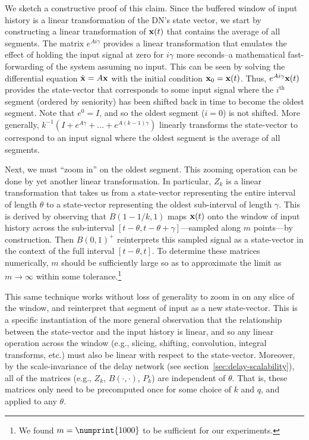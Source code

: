 We sketch a constructive proof of this claim.
Since the buffered window of input history is a linear transformation of the DN's state vector, we start by constructing a linear transformation of $\mathbf{x}(t)$ that contains the average of all segments. 
The matrix $e^{A i \gamma}$ provides a linear transformation that emulates the effect of holding the input signal at zero for $i \gamma$ more seconds--a mathematical fast-forwarding of the system assuming no input.
This can be seen by solving the differential equation $\dot{\mathbf{x}} = A \mathbf{x}$ with the initial condition $\mathbf{x}_0 = \mathbf{x}(t)$.
Thus, $e^{A i \gamma} \mathbf{x}(t)$ provides the state-vector that corresponds to some input signal where the $i^\text{th}$ segment (ordered by seniority) has been shifted back in time to become the oldest segment. 
Note that $e^0 = I$, and so the oldest segment ($i=0$) is not shifted.
More generally, $k^{-1} \left( I + e^{A \gamma} + \ldots + e^{A (k-1) \gamma} \right)$ linearly transforms the state-vector to correspond to an input signal where the oldest segment is the average of all segments.

Next, we must ``zoom in'' on the oldest segment.  
This zooming operation can be done by yet another linear transformation.
In particular, $Z_k$ is a linear transformation that takes us from a state-vector representing the entire interval of length $\theta$ to a state-vector representing the oldest sub-interval of length $\gamma$.
This is derived by observing that $B(1 - 1/k, 1)$ maps $\mathbf{x}(t)$ onto the window of input history across the sub-interval $[t - \theta, t - \theta + \gamma]$---sampled along $m$ points---by construction.
Then $B(0, 1)^+$ reinterprets this sampled signal as a state-vector in the context of the full interval $[t - \theta, t]$.
To determine these matrices numerically, $m$ should be sufficiently large so as to approximate the limit as $m \rightarrow \infty$ within some tolerance.\footnote{
We found $m = \numprint{1000}$ to be sufficient for our experiments.}

This same technique works without loss of generality to zoom in on any slice of the window, and reinterpret that segment of input as a new state-vector. This is a specific instantiation of the more general observation that the relationship between the state-vector and the input history is linear, and so any linear operation across the window (e.g., slicing, shifting, convolution, integral transforms, etc.) must also be linear with respect to the state-vector.
Moreover, by the scale-invariance of the delay network (see section~\ref{sec:delay-scalability}), all of the matrices (e.g., $Z_k$, $B(\cdot, \cdot)$, $P_k$) are independent of $\theta$. That is, these matrices only need to be precomputed once for some choice of $k$ and $q$, and applied to any $\theta$.

